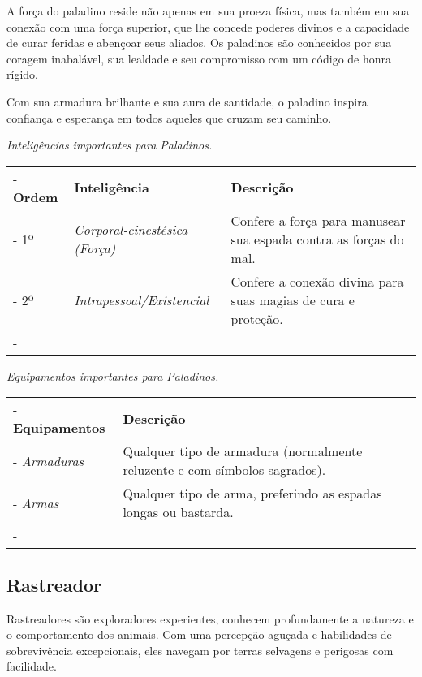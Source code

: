 A força do paladino reside não apenas em sua proeza física, mas também em sua conexão com uma força superior, que lhe concede poderes divinos e a capacidade de curar feridas e abençoar seus aliados. Os paladinos são conhecidos por sua coragem inabalável, sua lealdade e seu compromisso com um código de honra rígido. 

Com sua armadura brilhante e sua aura de santidade, o paladino inspira confiança e esperança em todos aqueles que cruzam seu caminho.

\begin{table}[htb]
	\centering\smaller
	\emph{Inteligências importantes para Paladinos.} \\
	\begin{tabu} to \textwidth {|X[c 0.5]|X[1]|X[3]|} \tabucline-
		\textbf{Ordem}	& \textbf{Inteligência}	&	\textbf{Descrição}	\\ \tabucline-
		1º		& \emph{Corporal-cinestésica (Força)} & Confere a força para manusear sua espada contra as forças do mal. \\ \tabucline-
		2º		& \emph{Intrapessoal/Existencial}  	& Confere a conexão divina para suas magias de cura e proteção. 	\\ \tabucline-
	\end{tabu}
\end{table}

\begin{table}[htb]
	\centering\smaller
	\emph{Equipamentos importantes para Paladinos.}
	\begin{tabu} to \textwidth {|X[0.5]|X[3]|} \tabucline-
		\textbf{Equipamentos}	&	\textbf{Descrição}	\\ \tabucline-
		\emph{Armaduras} & Qualquer tipo de armadura (normalmente reluzente e com símbolos sagrados).	\\ \tabucline-
		\emph{Armas} & Qualquer tipo de arma, preferindo as espadas longas ou bastarda. \\ \tabucline-
	\end{tabu}
\end{table}


\subsection*{Rastreador}
Rastreadores são exploradores experientes, conhecem profundamente a natureza e o comportamento dos animais. Com uma percepção aguçada e habilidades de sobrevivência excepcionais, eles navegam por terras selvagens e perigosas com facilidade.

